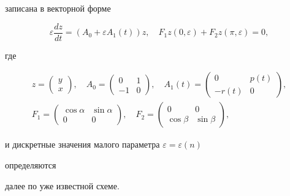 записана в векторной форме 


$$ 


\varepsilon\frac{d z}{d t}=(A_0+\varepsilon A_1(t))z,\quad 


F_1 z(0,\varepsilon)+F_2 z(\pi,\varepsilon)=0, 


$$ 


где 


\begin{gather*} 


z=\begin{pmatrix} 


y \\ x 


\end{pmatrix} 


,\quad A_0=\begin{pmatrix} 


0 & 1 \\ -1 & 0 


\end{pmatrix} 


,\quad A_1(t)=\begin{pmatrix} 


0 & p(t) \\ -r(t) & 0 


\end{pmatrix} 


,\\ 


F_1=\begin{pmatrix} 


\cos\alpha & \sin\alpha \\ 0 & 0 


\end{pmatrix} 


,\quad 


F_2=\begin{pmatrix} 


0 & 0 \\ \cos\beta & \sin\beta 


\end{pmatrix} 


,


\end{gather*} 


и дискретные значения малого параметра $\varepsilon=\varepsilon(n)$ 


определяются 


далее по уже известной схеме. 


 


